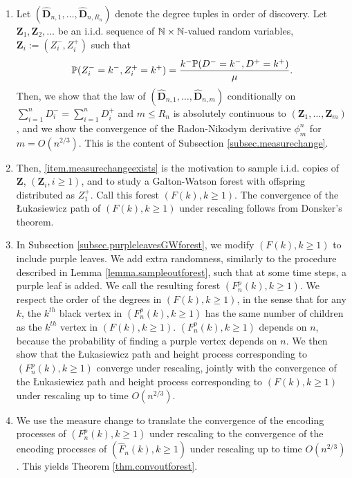 \begin{enumerate}
    \item \label{item.measurechangeexists} Let $(\mathbf{\hat{D}}_{n,1},\dots,\mathbf{\hat{D}}_{n,R_n})$ denote the degree tuples in order of discovery. Let $\mathbf{Z}_1, \mathbf{Z}_2, \ldots$ be an i.i.d. sequence of $\N\times \N$-valued random variables, $\mathbf{Z}_i:=(Z_i^-,Z_i^+)$ such that 
    $$\P(Z_i^-=k^-, Z_i^+=k^+)=\frac{k^-\P(D^-=k^-,D^+=k^+)}{\mu}.$$
    Then, we show that the law of $(\mathbf{\hat{D}}_{n,1},\dots,\mathbf{\hat{D}}_{n,m})$ conditionally on $\sum_{i=1}^n D_i^-=\sum_{i=1}^n D_i^+$ and $m \leq R_n$ is absolutely continuous to $(\mathbf{Z}_1,\dots, \mathbf{Z}_m)$, and we show the convergence of the Radon-Nikodym derivative $\phi_m^n$ for $m=O(n^{2/3})$. This is the content of Subsection \ref{subsec.measurechange}.
    \item Then, \ref{item.measurechangeexists} is the motivation to sample i.i.d. copies of $\mathbf{Z}$, $(\mathbf{Z}_i,i\geq 1)$, and to study a Galton-Watson forest with offspring distributed as $Z_1^+$. Call this forest $(F(k),k\geq 1)$. The convergence of the \L ukasiewicz path of $(F(k),k\geq 1)$ under rescaling follows from Donsker's theorem.
    \item In Subsection \ref{subsec.purpleleavesGWforest}, we modify $(F(k),k\geq 1)$ to include purple leaves. We add extra randomness, similarly to the procedure described in Lemma \ref{lemma.sampleoutforest}, such that at some time steps, a purple leaf is added. We call the resulting forest $(F^p_n(k),k\geq 1)$. We respect the order of the degrees in $(F(k),k\geq 1)$, in the sense that for any $k$, the $k^{th}$ black vertex in $(F^p_n(k),k\geq 1)$ has the same number of children as the $k^{th}$ vertex in $(F(k),k\geq 1)$. $(F^p_n(k),k\geq 1)$ depends on $n$, because the probability of finding a purple vertex depends on $n$. We then show that the \L ukasiewicz path and height process corresponding to $(F^p_n(k),k\geq 1)$ converge under rescaling, jointly with the convergence of the \L ukasiewicz path and height process corresponding to $(F(k),k\geq 1)$ under rescaling up to time $O(n^{2/3})$.
    \item We use the measure change to translate the convergence of the encoding processes of $(F^p_n(k),k\geq 1)$ under rescaling to the convergence of the encoding processes of $(\hat{F}_n(k),k\geq 1)$ under rescaling up to time $O(n^{2/3})$. This yields Theorem \ref{thm.convoutforest}. 
\end{enumerate}

